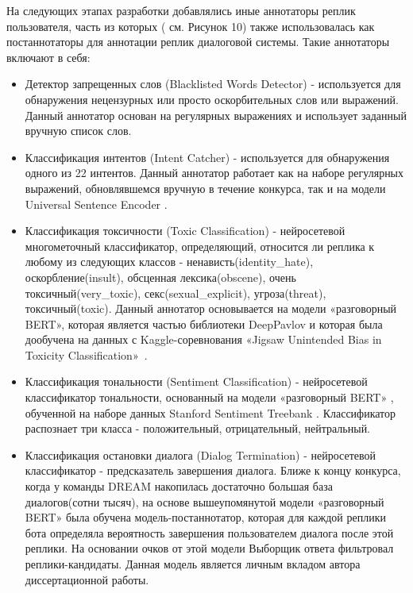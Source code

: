 На следующих этапах разработки добавлялись иные аннотаторы реплик пользователя, часть из которых ( см. Рисунок 10) также использовалась как постаннотаторы для аннотации реплик диалоговой системы. Такие аннотаторы включают в себя:
\begin{itemize}
\item Детектор запрещенных слов (Blacklisted Words Detector) - используется для обнаружения нецензурных или просто оскорбительных слов или выражений. Данный аннотатор основан на регулярных выражениях и использует заданный вручную список слов.

\item Классификация интентов (Intent Catcher) - используется для обнаружения одного из 22 интентов. Данный аннотатор работает как на наборе регулярных выражений, обновлявшемся вручную в течение конкурса, так и на модели Universal Sentence Encoder \cite{cer_2018}.

\item Классификация токсичности (Toxic Classification) - нейросетевой многометочный классификатор, определяющий, относится ли реплика к любому из следующих классов - ненависть(identity\_hate), оскорбление(insult), обсценная лексика(obscene), очень токсичный(very\_toxic), секс(sexual\_explicit), угроза(threat), токсичный(toxic). Данный аннотатор основывается на модели «разговорный BERT»\cite{dp_conv_bert}, которая является частью библиотеки DeepPavlov и которая была дообучена на данных с Kaggle-соревнования «Jigsaw Unintended Bias in Toxicity Classification»~\cite{toxic_kaggle}.

\item Классификация тональности (Sentiment Classification) - нейросетевой классификатор тональности, основанный на модели «разговорный BERT» \cite{na_website_ndn}, обученной на наборе данных Stanford Sentiment Treebank \cite{sst}. Классификатор распознает три класса - положительный, отрицательный, нейтральный.

\item Классификация остановки диалога (Dialog Termination) - нейросетевой классификатор - предсказатель завершения диалога. Ближе к концу конкурса, когда у команды {DREAM} накопилась достаточно большая база диалогов(сотни тысяч), на основе вышеупомянутой модели «разговорный BERT» была обучена модель-постаннотатор, которая для каждой реплики бота определяла вероятность завершения пользователем диалога после этой реплики. На основании очков от этой модели Выборщик ответа фильтровал реплики-кандидаты. Данная модель является личным вкладом автора диссертационной работы.


\end{itemize}
